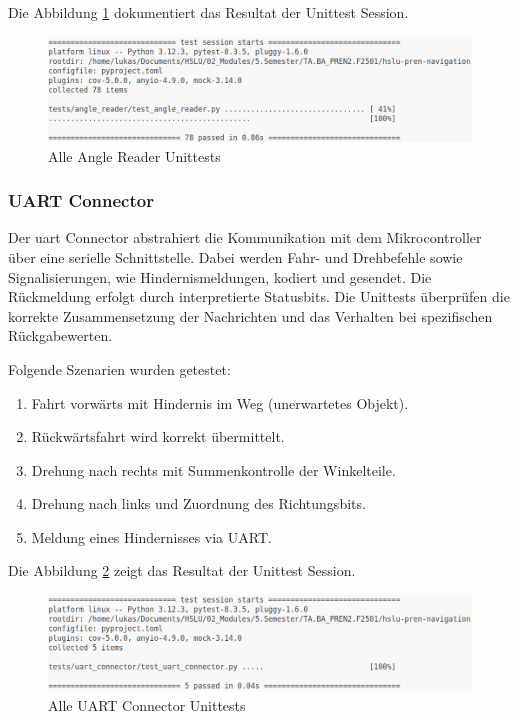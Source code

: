 Die Abbildung \ref{fig:angle-reader-unittests} dokumentiert das Resultat der Unittest Session.

\begin{figure}[H]
\centering
\includegraphics[width=\textwidth]{assets/IT/testing/unittests/angle_reader_unittests_result.png}
\caption{Alle Angle Reader Unittests}
\label{fig:angle-reader-unittests}
\end{figure}


\newpage
\subsubsection*{UART Connector}\label{uart-connector-unittests}

Der \acrfull{uart} Connector abstrahiert die Kommunikation mit dem Mikrocontroller über eine serielle Schnittstelle. Dabei werden Fahr- und Drehbefehle sowie Signalisierungen, wie Hindernismeldungen, kodiert und gesendet. Die Rückmeldung erfolgt durch interpretierte Statusbits. Die Unittests überprüfen die korrekte Zusammensetzung der Nachrichten und das Verhalten bei spezifischen Rückgabewerten.

Folgende Szenarien wurden getestet:

\begin{enumerate}
\item Fahrt vorwärts mit Hindernis im Weg (unerwartetes Objekt).
\item Rückwärtsfahrt wird korrekt übermittelt.
\item Drehung nach rechts mit Summenkontrolle der Winkelteile.
\item Drehung nach links und Zuordnung des Richtungsbits.
\item Meldung eines Hindernisses via UART.
\end{enumerate}

Die Abbildung \ref{fig:uart-connector-unittests} zeigt das Resultat der Unittest Session.

\begin{figure}[H]
\centering
\includegraphics[width=\textwidth]{assets/IT/testing/unittests/uart_connector_unittests_result.png}
\caption{Alle UART Connector Unittests}
\label{fig:uart-connector-unittests}
\end{figure}


